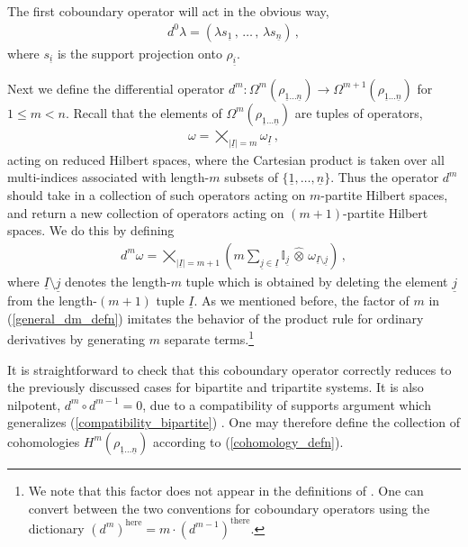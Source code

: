 \documentclass[12pt]{article}
\newcommand{\ul}[1]{{\underline{#1}}}
\newcommand{\wotimes}{ \, \widehat{\otimes} \, }
\numberwithin{equation}{section}
\newcommand{\rhooneton}{{\rho_{\ul{1} \ldots \ul{n}}}}
\begin{document}
The first coboundary operator will act in the obvious way,
%
\begin{align}
    d^0 \lambda = \left( \lambda s_{\ul{1}} \, , \, \ldots \, , \, \lambda s_{\ul{n}} \right) \, ,
\end{align}
%
where $s_{\ul{i}}$ is the support projection onto $\rho_{\ul{i}}$.

Next we define the differential operator $d^m : \Omega^m \left( \rho_{\ul{1} \ldots \ul{n}} \right) \rightarrow \Omega^{m+1} \left( \rho_{\ul{1} \ldots \ul{n}} \right)$ for $1 \leq m < n$. Recall that the elements of $\Omega^{m} \left( \rho_{\ul{1} \ldots \ul{n}} \right)$ are tuples of operators,
%
\begin{align}
    \omega = \bigtimes_{| \ul{I} | = m } \omega_{\ul{I}} \, ,
\end{align}
%
acting on reduced Hilbert spaces, where the Cartesian product is taken over all multi-indices associated with length-$m$ subsets of $\{ \ul{1} , \ldots , \ul{n} \}$. Thus the operator $d^m$ should take in a collection of such operators acting on $m$-partite Hilbert spaces, and return a new collection of operators acting on $(m+1)$-partite Hilbert spaces. We do this by defining
%
\begin{align}\label{general_dm_defn}
    d^m \omega = \bigtimes_{| \ul{I} | = m + 1} \left( m \sum_{\ul{j} \in \ul{I}} \mathbb{I}_{\ul{j}} \wotimes \omega_{\ul{I} \setminus \ul{j}} \right) \, ,
\end{align}
%
where $\ul{I} \setminus \ul{j}$ denotes the length-$m$ tuple which is obtained by deleting the element $\ul{j}$ from the length-$(m+1)$ tuple $\ul{I}$. As we mentioned before, the factor of $m$ in (\ref{general_dm_defn}) imitates the behavior of the product rule for ordinary derivatives by generating $m$ separate terms.\footnote{We note that this factor does not appear in the definitions of \cite{Mainiero:2019enr}. One can convert between the two conventions for coboundary operators using the dictionary $\left( d^m \right)^{\text{here}} = m \cdot \left( d^{m-1} \right)^{\text{there}}$.}

It is straightforward to check that this coboundary operator correctly reduces to the previously discussed cases for bipartite and tripartite systems. It is also nilpotent, $d^m \circ d^{m-1} = 0$, due to a compatibility of supports argument which generalizes (\ref{compatibility_bipartite}) \cite{Mainiero:2019enr}. One may therefore define the collection of cohomologies $H^m ( \rhooneton )$ according to (\ref{cohomology_defn}).
\end{document}
